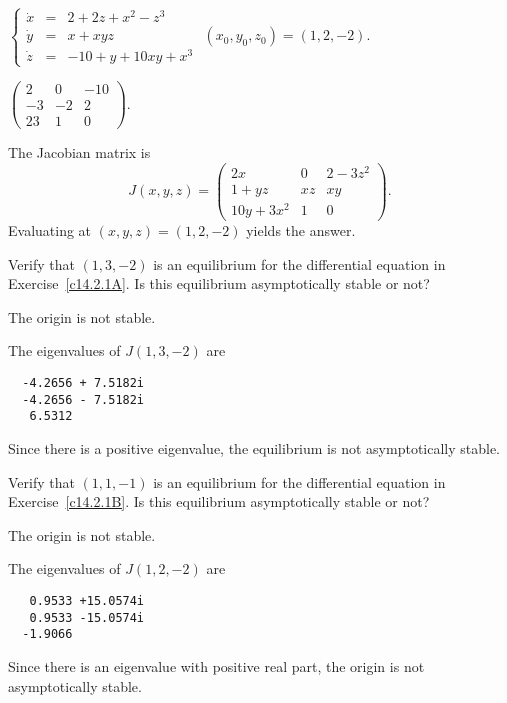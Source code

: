 \documentclass{ximera}
\begin{document}
\begin{exercise} \label{c14.2.1B}
$\left\{\begin{array}{rcl} 
\dot{x} & = & 2 + 2z + x^2 - z^3 \\
\dot{y} & = & x + xyz \\
\dot{z} & = & -10 + y + 10xy + x^3  \end{array}\right.$ 
\AND $(x_0,y_0,z_0) = (1,2,-2)$.

\begin{solution}
\ans $\left(\begin{array}{rrr}
2 & 0 & -10\\ -3 & -2 & 2 \\ 23 & 1 & 0 \end{array}\right)$.

\vspace{0.08in}

\soln  The Jacobian matrix is
\[
J(x,y,z) = \left(\begin{array}{ccc}
2x & 0 & 2-3z^2\\ 1+yz & xz & xy\\ 10y+3x^2 & 1 & 0 \end{array}\right).
\]
Evaluating at $(x,y,z)=(1,2,-2)$ yields the answer.


\end{solution}
\end{exercise}

\begin{exercise} \label{c14.2.1C}
Verify that $(1,3,-2)$ is an equilibrium for the differential equation in 
Exercise~\ref{c14.2.1A}.  Is this equilibrium asymptotically stable or not?

\begin{solution}
\ans The origin is not stable.

\soln The eigenvalues of $J(1,3,-2)$ are
\begin{verbatim}
  -4.2656 + 7.5182i
  -4.2656 - 7.5182i
   6.5312          
\end{verbatim}
Since there is a positive eigenvalue, the equilibrium is not 
asymptotically stable.


\end{solution}
\end{exercise}

\begin{exercise} \label{c14.2.1D}
Verify that $(1,1,-1)$ is an equilibrium for the differential equation in 
Exercise~\ref{c14.2.1B}.  Is this equilibrium asymptotically stable or not?

\begin{solution}
\ans The origin is not stable.

\soln The eigenvalues of $J(1,2,-2)$ are
\begin{verbatim}
   0.9533 +15.0574i
   0.9533 -15.0574i
  -1.9066    
\end{verbatim}
Since there is an eigenvalue with positive real part, the origin is not 
asymptotically stable.

\end{solution}
\end{exercise}
\end{document}
